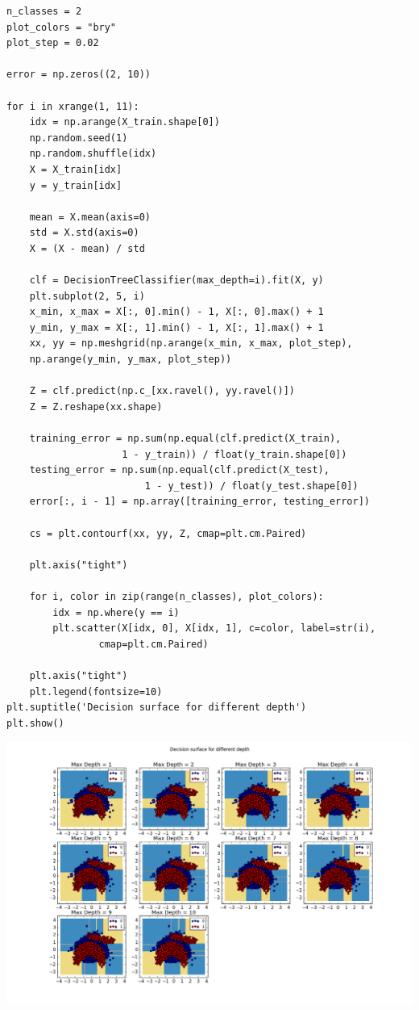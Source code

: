 \documentclass{article}
\begin{document}
\begin{verbatim}
n_classes = 2
plot_colors = "bry"
plot_step = 0.02

error = np.zeros((2, 10))

for i in xrange(1, 11):
	idx = np.arange(X_train.shape[0])
	np.random.seed(1)
	np.random.shuffle(idx)
	X = X_train[idx]
	y = y_train[idx]

	mean = X.mean(axis=0)
	std = X.std(axis=0)
	X = (X - mean) / std
	
	clf = DecisionTreeClassifier(max_depth=i).fit(X, y)
	plt.subplot(2, 5, i)
	x_min, x_max = X[:, 0].min() - 1, X[:, 0].max() + 1
	y_min, y_max = X[:, 1].min() - 1, X[:, 1].max() + 1
	xx, yy = np.meshgrid(np.arange(x_min, x_max, plot_step),
	np.arange(y_min, y_max, plot_step))
	
	Z = clf.predict(np.c_[xx.ravel(), yy.ravel()])
	Z = Z.reshape(xx.shape)
	
	training_error = np.sum(np.equal(clf.predict(X_train), 
					1 - y_train)) / float(y_train.shape[0])
	testing_error = np.sum(np.equal(clf.predict(X_test), 
						1 - y_test)) / float(y_test.shape[0])
	error[:, i - 1] = np.array([training_error, testing_error])
	
	cs = plt.contourf(xx, yy, Z, cmap=plt.cm.Paired)
	
	plt.axis("tight")
	
	for i, color in zip(range(n_classes), plot_colors):
		idx = np.where(y == i)
		plt.scatter(X[idx, 0], X[idx, 1], c=color, label=str(i),
				cmap=plt.cm.Paired)
	
	plt.axis("tight")
	plt.legend(fontsize=10)
plt.suptitle('Decision surface for different depth')
plt.show()
\end{verbatim}

\includegraphics[width = 7.5in]{2_1_2.png}
\end{document}
